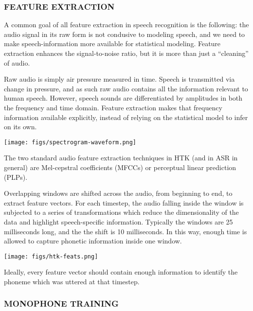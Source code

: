 \documentclass[10pt,a4paper]{article}
\begin{document}
\subsubsection*{FEATURE EXTRACTION}
  
A common goal of all feature extraction in speech recognition is the following: the audio signal in its raw form is not condusive to modeling speech, and we need to make speech-information more available for statistical modeling. Feature extraction enhances the signal-to-noise ratio, but it is more than just a ``cleaning'' of audio.

Raw audio is simply air pressure measured in time. Speech is transmitted via change in pressure, and as such raw audio contains all the information relevant to human speech. However, speech sounds are differentiated by amplitudes in both the frequency and time domain. Feature extraction makes that frequency information available explicitly, instead of relying on the statistical model to infer on its own.

  
\begin{center}
\texttt{[image: figs/spectrogram-waveform.png]}
\end{center}



The two standard audio feature extraction techniques in HTK (and in ASR in general) are Mel-cepstral coefficients (MFCCs) or perceptual linear prediction (PLPs).

  Overlapping windows are shifted across the audio, from beginning to end, to extract feature vectors. For each timestep, the audio falling inside the window is subjected to a series of transformations which reduce the dimensionality of the data and highlight speech-specific information. Typically the windows are 25 milliseconds long, and the the shift is 10 milliseconds. In this way, enough time is allowed to capture phonetic information inside one window.

  
\begin{center}
\texttt{[image: figs/htk-feats.png]}
\end{center}

Ideally, every feature vector should contain enough information to identify the phoneme which was uttered at that timestep.


\subsubsection*{MONOPHONE TRAINING}
\end{document}
